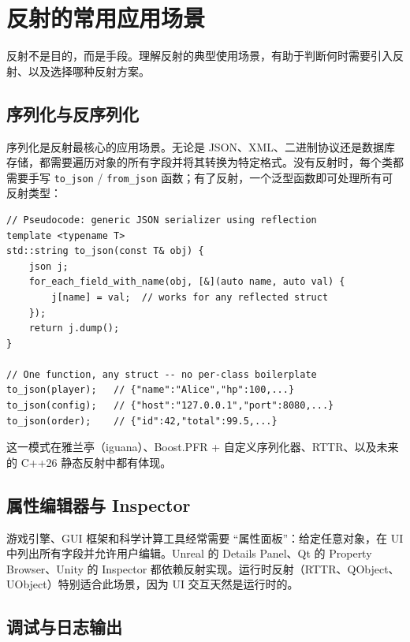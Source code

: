 \documentclass[12pt,a4paper,fontset=fandol]{ctexbook}
\begin{document}
\section{反射的常用应用场景}\label{sec:usecases}

反射不是目的，而是手段。理解反射的典型使用场景，有助于判断何时需要引入反射、以及选择哪种反射方案。

\subsection{序列化与反序列化}

序列化是反射最核心的应用场景。无论是 JSON、XML、二进制协议还是数据库存储，都需要遍历对象的所有字段并将其转换为特定格式。没有反射时，每个类都需要手写 \texttt{to\_json} / \texttt{from\_json} 函数；有了反射，一个泛型函数即可处理所有可反射类型：

\begin{lstlisting}[caption={反射驱动序列化: 一个泛型函数处理所有类型}]
// Pseudocode: generic JSON serializer using reflection
template <typename T>
std::string to_json(const T& obj) {
    json j;
    for_each_field_with_name(obj, [&](auto name, auto val) {
        j[name] = val;  // works for any reflected struct
    });
    return j.dump();
}

// One function, any struct -- no per-class boilerplate
to_json(player);   // {"name":"Alice","hp":100,...}
to_json(config);   // {"host":"127.0.0.1","port":8080,...}
to_json(order);    // {"id":42,"total":99.5,...}
\end{lstlisting}

这一模式在雅兰亭（iguana）、Boost.PFR + 自定义序列化器、RTTR、以及未来的 C++26 静态反射中都有体现。

\subsection{属性编辑器与 Inspector}

游戏引擎、GUI 框架和科学计算工具经常需要 ``属性面板''：给定任意对象，在 UI 中列出所有字段并允许用户编辑。Unreal 的 Details Panel、Qt 的 Property Browser、Unity 的 Inspector 都依赖反射实现。运行时反射（RTTR、QObject、UObject）特别适合此场景，因为 UI 交互天然是运行时的。

\subsection{调试与日志输出}
\end{document}
